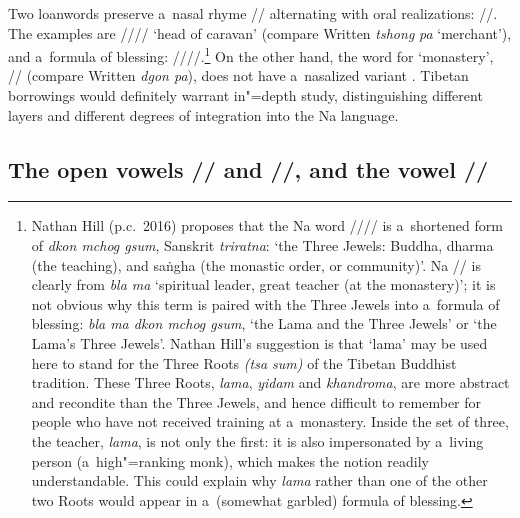 			Two  loanwords preserve a~nasal rhyme // alternating with oral realizations:
			//. The examples are //{\kern2pt}// ‘head of
			caravan’ (compare Written  \textit{tshong} \textit{pa} ‘merchant’), and a~formula of blessing:
			//{\kern2pt}//.\footnote{Nathan Hill (p.c.\ 2016) proposes that the Na word //{\kern2pt}// is a~shortened form of \textit{dkon mchog gsum}, Sanskrit \textit{triratna}: ‘the Three Jewels: Buddha, dharma (the teaching), and saṅgha (the monastic order, or community)’. Na // is clearly from \textit{bla ma} ‘spiritual leader, great teacher (at the monastery)’; it is not obvious why this term is paired with the Three Jewels into a~formula of blessing: \textit{bla ma dkon mchog gsum}, ‘the Lama and the Three Jewels’ or ‘the Lama's Three Jewels’. Nathan Hill's suggestion is that ‘lama’ may be used here to stand for the Three Roots \textit{(tsa sum)} of the {Tibetan} Buddhist tradition. These Three Roots, \textit{lama}, \textit{yidam} and \textit{khandroma}, are more abstract and recondite than the Three Jewels, and hence difficult to remember for people who have not received training at a~monastery. Inside the set of three, the teacher, \textit{lama}, is not only the first: it is also impersonated by a~living person (a~high"=ranking monk), which makes the notion readily understandable. This could explain why \textit{lama} rather than one of the other two Roots would appear in a~(somewhat garbled) formula of blessing.}
			On the
			other hand, the word for ‘monastery’, // (compare Written  \textit{dgon pa}), does not have a~nasalized variant . Tibetan borrowings would definitely warrant in"=depth study, distinguishing different layers and different degrees of integration into the Na language.
			

			\subsection{The open vowels  // and  //, and the vowel  //}
			\label{sec:theopenvowelsandandthevowel}
			
